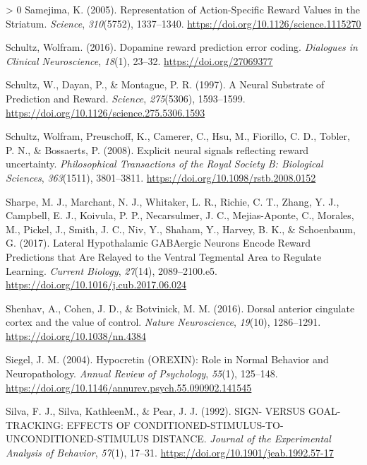\documentclass[
]{/home/nicoluarte/Downloads/templates/PNAS-template-main.tex}
\newlength{\cslhangindent}
\newenvironment{CSLReferences}[3] %
 {%
  \setlength{\parindent}{0pt}
  \ifodd #1 \everypar{\setlength{\hangindent}{\cslhangindent}}\ignorespaces\fi
  \ifnum #2 > 0
  \setlength{\parskip}{#2\baselineskip}
  \fi
 }%
 {}
\begin{document}
\begin{CSLReferences}{1}{0}
\leavevmode\hypertarget{ref-5CLQA59J}{}%
Samejima, K. (2005). Representation of Action-Specific Reward Values in
the Striatum. \emph{Science}, \emph{310}(5752), 1337--1340.
\url{https://doi.org/10.1126/science.1115270}

\leavevmode\hypertarget{ref-8B5TPXB5}{}%
Schultz, Wolfram. (2016). Dopamine reward prediction error coding.
\emph{Dialogues in Clinical Neuroscience}, \emph{18}(1), 23--32.
\url{https://doi.org/27069377}

\leavevmode\hypertarget{ref-33K2X73I}{}%
Schultz, W., Dayan, P., \& Montague, P. R. (1997). A Neural Substrate of
Prediction and Reward. \emph{Science}, \emph{275}(5306), 1593--1599.
\url{https://doi.org/10.1126/science.275.5306.1593}

\leavevmode\hypertarget{ref-YWWID6GW}{}%
Schultz, Wolfram, Preuschoff, K., Camerer, C., Hsu, M., Fiorillo, C. D.,
Tobler, P. N., \& Bossaerts, P. (2008). Explicit neural signals
reflecting reward uncertainty. \emph{Philosophical Transactions of the
Royal Society B: Biological Sciences}, \emph{363}(1511), 3801--3811.
\url{https://doi.org/10.1098/rstb.2008.0152}

\leavevmode\hypertarget{ref-4ESME7SG}{}%
Sharpe, M. J., Marchant, N. J., Whitaker, L. R., Richie, C. T., Zhang,
Y. J., Campbell, E. J., Koivula, P. P., Necarsulmer, J. C.,
Mejias-Aponte, C., Morales, M., Pickel, J., Smith, J. C., Niv, Y.,
Shaham, Y., Harvey, B. K., \& Schoenbaum, G. (2017). Lateral
Hypothalamic GABAergic Neurons Encode Reward Predictions that Are
Relayed to the Ventral Tegmental Area to Regulate Learning.
\emph{Current Biology}, \emph{27}(14), 2089--2100.e5.
\url{https://doi.org/10.1016/j.cub.2017.06.024}

\leavevmode\hypertarget{ref-J9QC5JYH}{}%
Shenhav, A., Cohen, J. D., \& Botvinick, M. M. (2016). Dorsal anterior
cingulate cortex and the value of control. \emph{Nature Neuroscience},
\emph{19}(10), 1286--1291. \url{https://doi.org/10.1038/nn.4384}

\leavevmode\hypertarget{ref-PQWIJHAP}{}%
Siegel, J. M. (2004). Hypocretin (OREXIN): Role in Normal Behavior and
Neuropathology. \emph{Annual Review of Psychology}, \emph{55}(1),
125--148. \url{https://doi.org/10.1146/annurev.psych.55.090902.141545}

\leavevmode\hypertarget{ref-ZW878GVH}{}%
Silva, F. J., Silva, KathleenM., \& Pear, J. J. (1992). SIGN- VERSUS
GOAL-TRACKING: EFFECTS OF CONDITIONED-STIMULUS-TO-UNCONDITIONED-STIMULUS
DISTANCE. \emph{Journal of the Experimental Analysis of Behavior},
\emph{57}(1), 17--31. \url{https://doi.org/10.1901/jeab.1992.57-17}


\end{CSLReferences}
\end{document}

